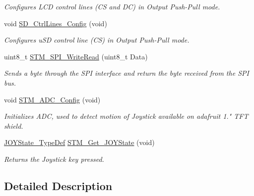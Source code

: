 \begin{DoxyCompactItemize}
\begin{DoxyCompactList}\small\item\em Configures L\+CD control lines (CS and DC) in Output Push-\/\+Pull mode. \end{DoxyCompactList}\item 
void \mbox{\hyperlink{group___s_t_m32_f1_x_x___n_u_c_l_e_o___l_o_w___l_e_v_e_l___private___functions_gab74f2e2b8a8574b00ea67be7fda66e1d}{S\+D\+\_\+\+Ctrl\+Lines\+\_\+\+Config}} (void)
\begin{DoxyCompactList}\small\item\em Configures u\+SD control line (CS) in Output Push-\/\+Pull mode. \end{DoxyCompactList}\item 
uint8\+\_\+t \mbox{\hyperlink{group___s_t_m32_f1_x_x___n_u_c_l_e_o___l_o_w___l_e_v_e_l___private___functions_ga018a36360d14b84d8e0e0b2d2471d673}{S\+T\+M\+\_\+\+S\+P\+I\+\_\+\+Write\+Read}} (uint8\+\_\+t Data)
\begin{DoxyCompactList}\small\item\em Sends a byte through the S\+PI interface and return the byte received from the S\+PI bus. \end{DoxyCompactList}\item 
void \mbox{\hyperlink{group___s_t_m32_f1_x_x___n_u_c_l_e_o___l_o_w___l_e_v_e_l___private___functions_ga7490dd52f52a50afa37e2ed329d5c82a}{S\+T\+M\+\_\+\+A\+D\+C\+\_\+\+Config}} (void)
\begin{DoxyCompactList}\small\item\em Initializes A\+DC, used to detect motion of Joystick available on adafruit 1." T\+FT shield. \end{DoxyCompactList}\item 
\mbox{\hyperlink{group___s_t_m32_f1_x_x___n_u_c_l_e_o___l_o_w___l_e_v_e_l___exported___types_ga7466d9ae142b713772373c9ddfc90332}{J\+O\+Y\+State\+\_\+\+Type\+Def}} \mbox{\hyperlink{group___s_t_m32_f1_x_x___n_u_c_l_e_o___l_o_w___l_e_v_e_l___private___functions_gab68de4912bc80f43614605cd410a0b4d}{S\+T\+M\+\_\+\+Get\+\_\+\+J\+O\+Y\+State}} (void)
\begin{DoxyCompactList}\small\item\em Returns the Joystick key pressed. \end{DoxyCompactList}\end{DoxyCompactItemize}


\subsection{Detailed Description}


